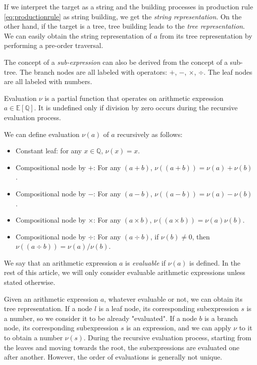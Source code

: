 If we interpret the target as a string and the building processes in production rule \eqref{eq:productionrule} as string building,
we get the \emph{string representation}. On the other hand, if the target is a tree, tree building leads to the \emph{tree representation}.
We can easily obtain the string representation of $a$ from its tree representation by performing a pre-order traversal.

The concept of a \emph{sub-expression} can also be derived from the concept of a sub-tree.
The branch nodes are all labeled with operators: $+$, $-$, $\times$, $\div$. The leaf nodes are all labeled with numbers.

Evaluation $\nu$ is a partial function that operates on arithmetic expression $a \in \mathbb{E} \left [\mathbb{Q} \right ]$.
It is undefined only if division by zero occurs during the recursive evaluation process.

We can define evaluation $\nu(a)$ of $a$ recursively as follows:
\begin{itemize}
  \item Constant leaf: for any $x \in \mathbb{Q}$, $\nu(x) = x$.
  \item Compositional node by $+$: For any $(a + b)$, $\nu((a + b)) = \nu(a) + \nu(b)$.
  \item Compositional node by $-$: For any $(a - b)$, $\nu((a - b)) = \nu(a) - \nu(b)$.
  \item Compositional node by $\times$: For any $(a \times b)$, $\nu((a \times b)) = \nu(a) \nu(b)$.
  \item Compositional node by $\div$: For any $(a \div b)$, if $\nu(b) \neq 0$, then $\nu((a \div b)) = \nu(a) / \nu(b)$.
\end{itemize}

We say that an arithmetic expression $a$ is \emph{evaluable} if $\nu(a)$ is defined.
In the rest of this article, we will only consider evaluable arithmetic expressions unless stated otherwise.

Given an arithmetic expression $a$, whatever evaluable or not, we can obtain its tree representation.
If a node $l$ is a leaf node, its corresponding subexpression $s$ is a number, so we consider it to be already "evaluated".
If a node $b$ is a branch node, its corresponding subexpression $s$ is an expression, and we can apply $\nu$ to it to obtain a number $\nu(s)$.
During the recursive evaluation process, starting from the leaves and moving towards the root, the subexpressions are evaluated one after another.
However, the order of evaluations is generally not unique.

